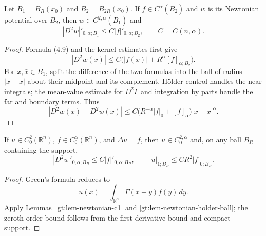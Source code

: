 \begin{lemma}\label{gt:lem-newtonian-holder-ball}
Let $B_1=B_R(x_0)$ and $B_2=B_{2R}(x_0)$. If
$f\in C^\alpha(\overline B_2)$ and $w$ is its Newtonian potential over
$B_2$, then $w\in C^{2,\alpha}(\overline B_1)$ and
\begin{equation}
\tag{4.11}
|D^2w|'_{0,\alpha;B_1}\leq C|f|'_{0,\alpha;B_2},
\qquad C=C(n,\alpha).
\end{equation}
\end{lemma}
\begin{proof}
\sketch Formula (4.9) and the kernel estimates first give
\begin{equation}
\tag{4.12}
|D^2w(x)|\leq C\bigl(|f(x)|+R^\alpha[f]_{\alpha;B_2}\bigr).
\end{equation}
For $x,\bar x\in B_1$, split the difference of the two formulas into the
ball of radius $|x-\bar x|$ about their midpoint and its complement. H\"older
control handles the near integrals; the mean-value estimate for
$D^2\Gamma$ and integration by parts handle the far and boundary terms.
Thus
\begin{equation}
\tag{4.13}
|D^2w(x)-D^2w(\bar x)|
\leq C\bigl(R^{-\alpha}|f|_0+[f]_\alpha\bigr)|x-\bar x|^\alpha.
\end{equation}
\end{proof}

\begin{theorem}\label{gt:thm-poisson-compact-support}
If $u\in C_0^2(\mathbb R^n)$, $f\in C_0^\alpha(\mathbb R^n)$, and
$\Delta u=f$, then $u\in C_0^{2,\alpha}$ and, on any ball $B_R$ containing
the support,
\begin{equation}
\tag{4.14}
|D^2u|'_{0,\alpha;B_R}\leq C|f|'_{0,\alpha;B_R},
\qquad |u|_{1;B_R}\leq CR^2|f|_{0;B_R}.
\end{equation}
\end{theorem}
\begin{proof}
\sketch Green's formula reduces to
\begin{equation}
\tag{4.15}
u(x)=\int_{\mathbb R^n}\Gamma(x-y)f(y)\,dy.
\end{equation}
Apply Lemmas~\ref{gt:lem-newtonian-c1} and
\ref{gt:lem-newtonian-holder-ball}; the zeroth-order bound follows from the
first derivative bound and compact support.
\end{proof}

